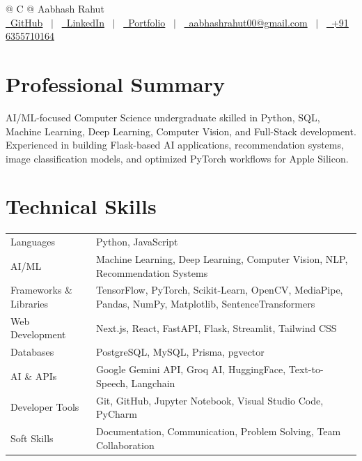 \documentclass[a4paper,10pt]{article}
\begin{document}
\pagestyle{empty}

\begin{tabularx}{\linewidth}{@{} C @{}}
\Large{Aabhash Rahut}\\[2pt]
\href{https://github.com/Aabhash-19}{\raisebox{-0.05\height}\faGithub\ GitHub} \ $|$ \ 
\href{https://www.linkedin.com/in/aabhash-rahut-395589202/}{\raisebox{-0.05\height}\faLinkedin\ LinkedIn} \ $|$ \ 
\href{https://aabhash-19.vercel.app}{\raisebox{-0.05\height}\faGlobe\ Portfolio} \ $|$ \ 
\href{mailto:aabhashrahut00@gmail.com}{\raisebox{-0.05\height}\faEnvelope\ aabhashrahut00@gmail.com} \ $|$ \ 
\href{tel:+916355710164}{\raisebox{-0.05\height}\faMobile\ +91 6355710164}\\
\end{tabularx}

\section{Professional Summary}
AI/ML-focused Computer Science undergraduate skilled in Python, SQL, Machine Learning, Deep Learning, Computer Vision, and Full-Stack development. Experienced in building Flask-based AI applications, recommendation systems, image classification models, and optimized PyTorch workflows for Apple Silicon.

\section{Technical Skills}
\begin{tabularx}{\linewidth}{@{}l X@{}}
Languages & \normalsize{Python, JavaScript}\\
AI/ML & \normalsize{Machine Learning, Deep Learning, Computer Vision, NLP, Recommendation Systems}\\
Frameworks \& Libraries & \normalsize{TensorFlow, PyTorch, Scikit-Learn, OpenCV, MediaPipe, Pandas, NumPy, Matplotlib, SentenceTransformers}\\
Web Development & \normalsize{Next.js, React, FastAPI, Flask, Streamlit, Tailwind CSS}\\
Databases & \normalsize{PostgreSQL, MySQL, Prisma, pgvector}\\
AI \& APIs & \normalsize{Google Gemini API, Groq AI, HuggingFace, Text-to-Speech, Langchain}\\
Developer Tools & \normalsize{Git, GitHub, Jupyter Notebook, Visual Studio Code, PyCharm}\\
Soft Skills & \normalsize{Documentation, Communication, Problem Solving, Team Collaboration}\\
\end{tabularx}
\end{document}
